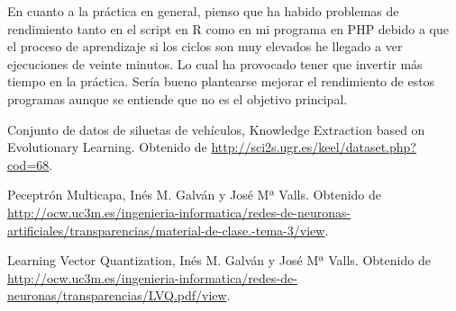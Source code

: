 \documentclass[11pt,spanish,listoffigures,listoftables]{workluis}
\begin{document}
\par En cuanto a la práctica en general, pienso que ha habido problemas de rendimiento tanto en el script en R como en mi programa en PHP debido a que el proceso de aprendizaje si los ciclos son muy elevados he llegado a ver ejecuciones de veinte minutos. Lo cual ha provocado tener que invertir más tiempo en la práctica. Sería bueno plantearse mejorar el rendimiento de estos programas aunque se entiende que no es el objetivo principal.


\begin{thebibliography}{10}


   Conjunto de datos de siluetas de vehículos, 
   \newblock Knowledge Extraction based on Evolutionary Learning. 
   \newblock Obtenido de
   \url{http://sci2s.ugr.es/keel/dataset.php?cod=68}.

   Peceptrón Multicapa, 
   \newblock Inés M. Galván y José Mª Valls.
   \newblock Obtenido de
   \url{http://ocw.uc3m.es/ingenieria-informatica/redes-de-neuronas-artificiales/transparencias/material-de-clase.-tema-3/view}.

   Learning Vector Quantization, 
   \newblock Inés M. Galván y José Mª Valls.
   \newblock Obtenido de
   \url{http://ocw.uc3m.es/ingenieria-informatica/redes-de-neuronas/transparencias/LVQ.pdf/view}.

   

\end{thebibliography}
\cleardoublepage

\end{document}
